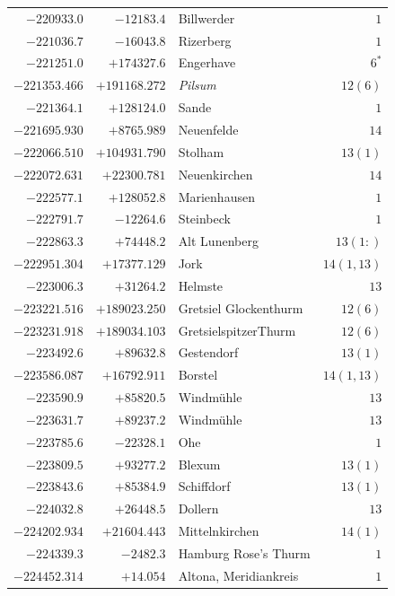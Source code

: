 \begin{center}
\begin{tabular}{r|r|p{170pt}|r}
\(-220933.0\)&\(-12183.4\)&Billwerder&\(1\)\\
\(-221036.7\)&\(-16043.8\)&Rizerberg&\(1\)\\
\(-221251.0\)&\(+174327.6\)&Engerhave&\(6^{*}\)\\
\(-221353.466\)&\(+191168.272\)&\textit{Pilsum}&\(12 (6)\)\\
\(-221364.1\)&\(+128124.0\)&Sande&\(1\)\\
\(-221695.930\)&\(+8765.989\)&Neuenfelde&\(14\)\\
\(-222066.510\)&\(+104931.790\)&Stolham&\(13 (1)\)\\
\(-222072.631\)&\(+22300.781\)&Neuenkirchen&\(14\)\\
\(-222577.1\)&\(+128052.8\)&Marienhausen&\(1\)\\
\(-222791.7\)&\(-12264.6\)&Steinbeck&\(1\)\\
\(-222863.3\)&\(+74448.2\)&Alt Lunenberg&\(13 (1:)\)\\
\(-222951.304\)&\(+17377.129\)&Jork&\(14(1,13)\)\\
\(-223006.3\)&\(+31264.2\)&Helmste&\(13\)\\
\(-223221.516\)&\(+189023.250\)&Gretsiel Glockenthurm&\(12 (6)\)\\
\(-223231.918\)&\(+189034.103\)&GretsielspitzerThurm&\(12 (6)\)\\
\(-223492.6\)&\(+89632.8\)&Gestendorf&\(13 (1)\)\\
\(-223586.087\)&\(+16792.911\)&Borstel&\(14(1,13)\)\\
\(-223590.9\)&\(+85820.5\)&Windmühle&\(13\)\\
\(-223631.7\)&\(+89237.2\)&Windmühle&\(13\)\\
\(-223785.6\)&\(-22328.1\)&Ohe&\(1\)\\
\(-223809.5\)&\(+93277.2\)&Blexum&\(13 (1)\)\\
\(-223843.6\)&\(+85384.9\)&Schiffdorf&\(13 (1)\)\\
\(-224032.8\)&\(+26448.5\)&Dollern&\(13\)\\
\(-224202.934\)&\(+21604.443\)&Mittelnkirchen&\(14 (1)\)\\
\(-224339.3\)&\(-2482.3\)&Hamburg Rose’s Thurm&\(1\)\\
\(-224452.314\)&\(+14.054\)&Altona, Meridiankreis&\(1\)\\
\hline\end{tabular}\endgroup\end{center}
